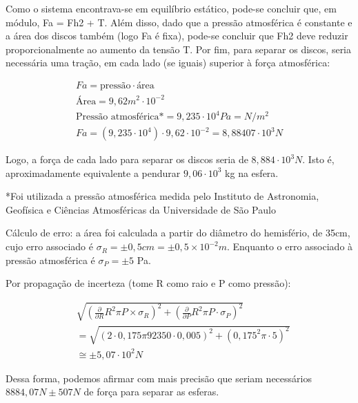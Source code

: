 Como o sistema encontrava-se em equilíbrio estático, pode-se concluir que, em módulo, Fa = Fh2 + T. Além disso, dado que a pressão atmosférica é constante e a área dos discos também (logo Fa é fixa), pode-se concluir que Fh2 deve reduzir proporcionalmente ao aumento da tensão T. Por fim, para separar os discos, seria necessária uma tração, em cada lado (se iguais) superior à força atmosférica:

\begin{align*}
    Fa = \text{pressão} \cdot\text{área}\\
    \text{Área} = 9,62 m^2 \cdot 10^{-2}\\
    \text{Pressão atmosférica*} = 9,235 \cdot 10^4 Pa = N/m^2\\
    Fa = (9,235 \cdot10^4) \cdot 9,62 \cdot 10^{-2} = 8,88407 \cdot 10^3 N  
\end{align*}

	Logo, a força de cada lado para separar os discos seria de \(8,884 \cdot 10^3 N\). Isto é, aproximadamente equivalente a pendurar \(9,06 \cdot10^3\) kg na esfera.
 
    *Foi utilizada a pressão atmosférica medida pelo Instituto de Astronomia, Geofísica e Ciências Atmosféricas da Universidade de São Paulo %

    
	Cálculo de erro: a área foi calculada a partir do diâmetro do hemisfério, de 35cm, cujo erro associado é \(\sigma_R = \pm0,5cm = \pm0,5\times10^{-2}m\). Enquanto o erro associado à pressão atmosférica é \(\sigma_P = \pm 5\) Pa.

	Por propagação de incerteza (tome R como raio e P como pressão):

\begin{align*}
&\sqrt{\left( \frac{\partial }{\partial R} R^{2}\pi P \times\sigma_R \right)^{2} + \left( \frac{\partial }{\partial P} R^{2}\pi P \cdot\sigma_P \right)^{2}}\\
&= \sqrt{\left( 2 \cdot 0,175 \pi 92350 \cdot 0,005 \right)^{2} + \left(0,175^{2}\pi \cdot 5 \right)^{2}} \\
&\cong  \pm 5,07 \cdot 10^2 N
\end{align*}

    Dessa forma, podemos afirmar com mais precisão que seriam necessários \(8884,07 N \pm 507 N\) de força para separar as esferas. 

